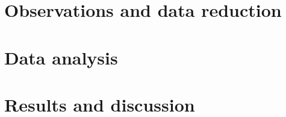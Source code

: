\documentclass[useAMS,usenatbib,a4paper]{mn2e}
\begin{document}
%
%
%
%
%
%
%
%
%
%
%
%
%



\section{Observations and data reduction}



\section{Data analysis}
\label{sect:data_analysis}



\section{Results and discussion}
\end{document}
